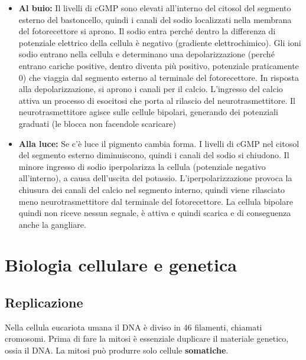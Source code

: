 \documentclass[a4paper]{article}
\begin{document}
\begin{itemize}
    \item \textbf{Al buio:}
        Il livelli di cGMP sono elevati all'interno del citosol del segmento esterno
        del bastoncello, quindi i canali del sodio localizzati nella membrana del fotorecettore
        si aprono. Il sodio entra perché dentro la differenza di potenziale
        elettrico della cellula è negativo (gradiente elettrochimico).
        Gli ioni sodio entrano nella cellula e determinano una depolarizzazione
        (perché entrano cariche positive, dentro diventa più positivo, potenziale praticamente 0) che viaggia
        dal segmento esterno al terminale del fotorecettore. 
        In risposta alla depolarizzazione, si aprono i canali per il calcio.
        L'ingresso del calcio attiva un processo di esocitosi che porta al rilascio del neurotrasmettitore.
        Il neurotrasmettitore agisce sulle cellule bipolari, generando dei potenziali graduati (le blocca non facendole scaricare)
    \item \textbf{Alla luce:}
        Se c'è luce il pigmento cambia forma. I livelli di cGMP nel citosol del segmento esterno diminuiscono, quindi i canali del sodio si chiudono.
        Il minore ingresso di sodio iperpolarizza la cellula (potenziale negativo all'interno),
        a causa dell'uscita del potassio.
        L'iperpolarizzazione provoca la chiusura dei canali del calcio nel segmento interno,
        quindi viene rilasciato meno neurotrasmettitore dal terminale del fotorecettore.
        La cellula bipolare quindi non riceve nessun segnale, è attiva e quindi scarica
        e di conseguenza anche la gangliare.
\end{itemize}

\pagebreak

\section{Biologia cellulare e genetica}

\subsection{Replicazione}

Nella cellula eucariota umana il DNA è diviso in 46 filamenti, chiamati cromosomi.
Prima di fare la mitosi è essenziale duplicare il materiale genetico, ossia il DNA.
La mitosi può produrre solo cellule \textbf{somatiche}.
\end{document}
